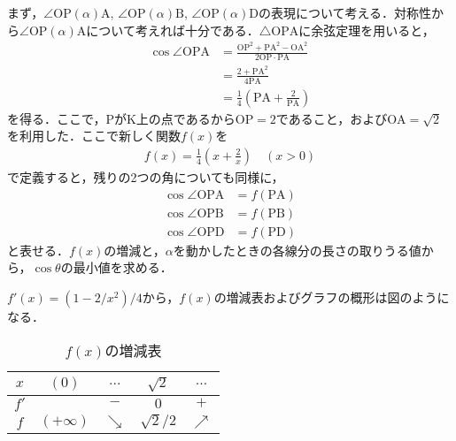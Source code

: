 \documentclass[a4paper,10pt]{ltjsarticle}
\begin{document}
\begin{multicols}{2}
まず，$\angle \mathrm{OP}(\alpha)\mathrm{A}$, $\angle \mathrm{OP}(\alpha)\mathrm{B}$, $\angle \mathrm{OP}(\alpha)\mathrm{D}$の表現について考える．対称性から$\angle \mathrm{OP}(\alpha)\mathrm{A}$について考えれば十分である．$\triangle \mathrm{OPA}$に余弦定理を用いると，
\begin{align*}
\cos \angle \mathrm{OPA} 
&= \frac{\mathrm{OP}^2 + \mathrm{PA}^2 - \mathrm{OA}^2}{2 \mathrm{OP} \cdot \mathrm{PA}} \\
&= \frac{2 + \mathrm{PA}^2 }{4\mathrm{PA}} \\
&= \frac{1}{4} \left(\mathrm{PA} + \frac{2}{\mathrm{PA}}\right)
\end{align*}
を得る．ここで，PがK上の点であるから$\mathrm{OP} = 2$であること，および$\mathrm{OA}=\sqrt{2}$を利用した．ここで新しく関数$f(x)$を
\begin{align*}
f(x) = \frac{1}{4}\left(x + \frac{2}{x}\right) \quad (x > 0)
\end{align*}
で定義すると，残りの2つの角についても同様に，
\begin{align*}
 \cos \angle \mathrm{OPA} &= f(\mathrm{PA}) \\
 \cos \angle \mathrm{OPB} &= f(\mathrm{PB}) \\
 \cos \angle \mathrm{OPD} &= f(\mathrm{PD}) 
\end{align*}
と表せる．$f(x)$の増減と，$\alpha$を動かしたときの各線分の長さの取りうる値から，$\cos\theta$の最小値を求める．

$f'(x)=(1-2/x^2)/4$から，$f(x)$の増減表およびグラフの概形は図のようになる．

\begin{table}[H]
    \centering
\caption{$f(x)$の増減表}
\begin{tabular}{|c||c|c|c|c|}
\hline
$x$ & $(0)$ & $\dots$ & $\sqrt{2}$ & $\dots$ \\
\hline
$f'$ & & $-$ & $0$ & $+$ \\
\hline
$f$ & $(+\infty)$ & $\searrow$ & $\sqrt{2}/2$ & $\nearrow$ \\
\hline
\end{tabular}
\end{table}

\begin{figure}[H]
  \centering
{}
\end{figure}
\end{multicols}
\end{document}
